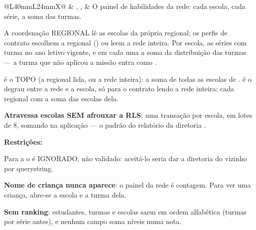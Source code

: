 \begin{tabularx}{\linewidth}{@{}L{40mm}L{24mm}X@{}}
 & , ,  & O painel de habilidades da rede: cada escola, cada série, a soma das turmas.\par A coordenação REGIONAL lê as escolas da própria regional; os perfis de contrato escolhem a regional () ou leem a rede inteira. Por escola, as séries com turma no ano letivo vigente, e em cada uma a soma da distribuição das turmas --- a turma que não aplicou a missão entra como .\par {} é o TOPO (a regional lida, ou a rede inteira): a soma de todas as escolas de .  é o degrau entre a rede e a escola, só para o contrato lendo a rede inteira: cada regional com a soma das escolas dela.\par \textbf{Atravessa escolas SEM afrouxar a RLS}: uma transação por escola, em lotes de 8, somando na aplicação --- o padrão do relatório da diretoria .\par \textbf{Restrições:}\par \hspace*{1em}\textbullet{} Para a  o  é IGNORADO, não validado: aceitá-lo seria dar a diretoria do vizinho por querystring.\par \hspace*{1em}\textbullet{} \textbf{Nome de criança nunca aparece}: o painel da rede é contagem. Para ver uma criança, abre-se a escola e a turma dela.\par \hspace*{1em}\textbullet{} \textbf{Sem ranking}: estudantes, turmas e escolas saem em ordem alfabética (turmas por série antes), e nenhum campo soma níveis numa nota.\\

\end{tabularx}
